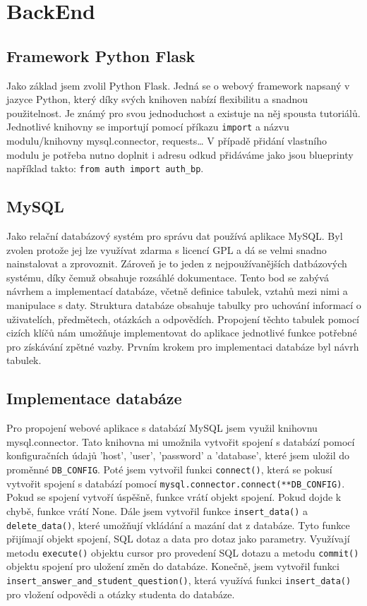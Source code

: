 \documentclass[11pt,a4paper,twoside,openright]{report}
\begin{document}
\chapter{BackEnd}

\section{Framework Python Flask}
Jako základ jsem zvolil Python Flask. Jedná se o webový framework napsaný v jazyce Python, který díky svých knihoven nabízí flexibilitu a snadnou použitelnost. Je známý pro svou jednoduchost a existuje na něj spousta tutoriálů. Jednotlivé knihovny se importují pomocí příkazu \texttt{import} a názvu modulu/knihovny mysql.connector, requests… V případě přidání vlastního modulu je potřeba nutno doplnit i adresu odkud přidáváme jako jsou blueprinty například takto: \texttt{from auth import auth\_bp}.

\section{MySQL}
Jako relační databázový systém pro správu dat používá aplikace MySQL. Byl zvolen protože jej lze využívat zdarma s licencí GPL a dá se velmi snadno nainstalovat a zprovoznit. Zároveň je to jeden z nejpoužívanějších datbázových systému, díky čemuž obsahuje rozsáhlé dokumentace. Tento bod se zabývá návrhem a implementací databáze, včetně definice tabulek, vztahů mezi nimi a manipulace s daty. Struktura databáze obsahuje tabulky pro uchování informací o uživatelích, předmětech, otázkách a odpovědích. Propojení těchto tabulek pomocí cizích klíčů nám umožňuje implementovat do aplikace jednotlivé funkce potřebné pro získávání zpětné vazby. Prvním krokem pro implementaci databáze byl návrh tabulek. 

\section{Implementace databáze}

Pro propojení webové aplikace s databází MySQL jsem využil knihovnu mysql.connector. Tato knihovna mi umožnila vytvořit spojení s databází pomocí konfiguračních údajů {'host', 'user', 'password' a 'database'}, které jsem uložil do proměnné \texttt{DB\_CONFIG}. 
Poté jsem vytvořil funkci \texttt{connect()}, která se pokusí vytvořit spojení s databází pomocí \texttt{mysql.connector.connect(**DB\_CONFIG)}. Pokud se spojení vytvoří úspěšně, funkce vrátí objekt spojení. Pokud dojde k chybě, funkce vrátí None.
Dále jsem vytvořil funkce \texttt{insert\_data()} a \texttt{delete\_data()}, které umožňují vkládání a mazání dat z databáze. Tyto funkce přijímají objekt spojení, SQL dotaz a data pro dotaz jako parametry. Využívají metodu \texttt{execute()} objektu cursor pro provedení SQL dotazu a metodu \texttt{commit()} objektu spojení pro uložení změn do databáze.
Konečně, jsem vytvořil funkci \texttt{insert\_answer\_and\_student\_question()}, která využívá funkci \texttt{insert\_data()} pro vložení odpovědi a otázky studenta do databáze.
\end{document}
